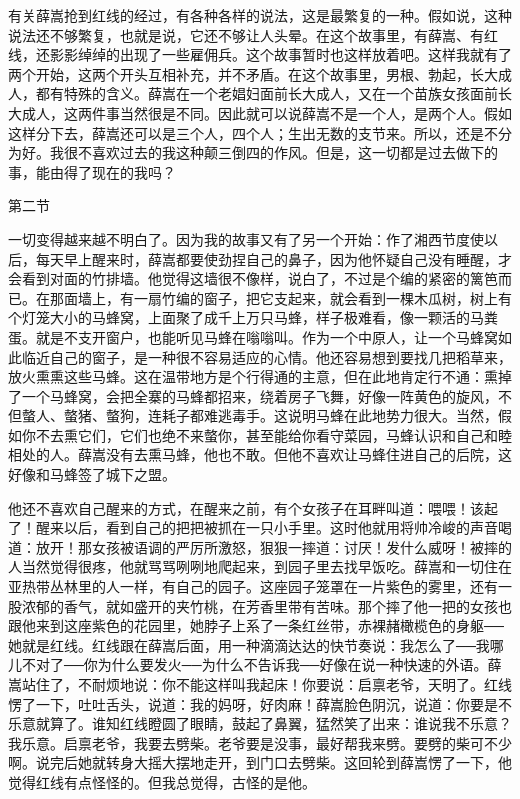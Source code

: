 有关薛嵩抢到红线的经过，有各种各样的说法，这是最繁复的一种。假如说，这种说法还不够繁复，也就是说，它还不够让人头晕。在这个故事里，有薛嵩、有红线，还影影绰绰的出现了一些雇佣兵。这个故事暂时也这样放着吧。这样我就有了两个开始，这两个开头互相补充，并不矛盾。在这个故事里，男根、勃起，长大成人，都有特殊的含义。薛嵩在一个老娼妇面前长大成人，又在一个苗族女孩面前长大成人，这两件事当然很是不同。因此就可以说薛嵩不是一个人，是两个人。假如这样分下去，薛嵩还可以是三个人，四个人；生出无数的支节来。所以，还是不分为好。我很不喜欢过去的我这种颠三倒四的作风。但是，这一切都是过去做下的事，能由得了现在的我吗？ 

第二节 

一切变得越来越不明白了。因为我的故事又有了另一个开始：作了湘西节度使以后，每天早上醒来时，薛嵩都要使劲捏自己的鼻子，因为他怀疑自己没有睡醒，才会看到对面的竹排墙。他觉得这墙很不像样，说白了，不过是个编的紧密的篱笆而已。在那面墙上，有一扇竹编的窗子，把它支起来，就会看到一棵木瓜树，树上有个灯笼大小的马蜂窝，上面聚了成千上万只马蜂，样子极难看，像一颗活的马粪蛋。就是不支开窗户，也能听见马蜂在嗡嗡叫。作为一个中原人，让一个马蜂窝如此临近自己的窗子，是一种很不容易适应的心情。他还容易想到要找几把稻草来，放火熏熏这些马蜂。这在温带地方是个行得通的主意，但在此地肯定行不通：熏掉了一个马蜂窝，会把全寨的马蜂都招来，绕着房子飞舞，好像一阵黄色的旋风，不但螫人、螫猪、螫狗，连耗子都难逃毒手。这说明马蜂在此地势力很大。当然，假如你不去熏它们，它们也绝不来螫你，甚至能给你看守菜园，马蜂认识和自己和睦相处的人。薛嵩没有去熏马蜂，他也不敢。但他不喜欢让马蜂住进自己的后院，这好像和马蜂签了城下之盟。 

他还不喜欢自己醒来的方式，在醒来之前，有个女孩子在耳畔叫道：喂喂！该起了！醒来以后，看到自己的把把被抓在一只小手里。这时他就用将帅冷峻的声音喝道：放开！那女孩被语调的严厉所激怒，狠狠一摔道：讨厌！发什么威呀！被摔的人当然觉得很疼，他就骂骂咧咧地爬起来，到园子里去找早饭吃。薛嵩和一切住在亚热带丛林里的人一样，有自己的园子。这座园子笼罩在一片紫色的雾里，还有一股浓郁的香气，就如盛开的夹竹桃，在芳香里带有苦味。那个摔了他一把的女孩也跟他来到这座紫色的花园里，她脖子上系了一条红丝带，赤裸赭橄榄色的身躯──她就是红线。红线跟在薛嵩后面，用一种滴滴达达的快节奏说：我怎么了──我哪儿不对了──你为什么要发火──为什么不告诉我──好像在说一种快速的外语。薛嵩站住了，不耐烦地说：你不能这样叫我起床！你要说：启禀老爷，天明了。红线愣了一下，吐吐舌头，说道：我的妈呀，好肉麻！薛嵩脸色阴沉，说道：你要是不乐意就算了。谁知红线瞪圆了眼睛，鼓起了鼻翼，猛然笑了出来：谁说我不乐意？我乐意。启禀老爷，我要去劈柴。老爷要是没事，最好帮我来劈。要劈的柴可不少啊。说完后她就转身大摇大摆地走开，到门口去劈柴。这回轮到薛嵩愣了一下，他觉得红线有点怪怪的。但我总觉得，古怪的是他。 

